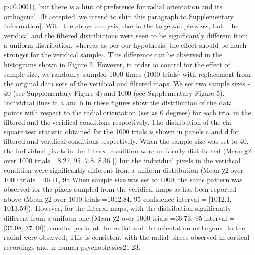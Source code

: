 	p<0.0001), but there is a hint of preference for radial orientation and its orthogonal.
	[If accepted, we intend to shift this paragraph to Supplementary Information]. With the above
	analysis, due to the large sample sizes, both the veridical and the filtered distributions were seen
	to be significantly different from a uniform distribution, whereas as per our hypothesis, the effect
	should be much stronger for the veridical samples. This difference can be observed in the
	histograms shown in Figure 2. However, in order to control for the effect of sample size, we
	randomly sampled 1000 times (1000 trials) with replacement from the original data sets of the
	veridical and filtered maps. We set two sample sizes - 40 (see Supplementary Figure 4) and
	1000 (see Supplementary Figure 5). Individual lines in a and b in these figures show the
	distribution of the data points with respect to the radial orientation (set as 0 degrees) for each
	trial in the filtered and the veridical conditions respectively. The distribution of the chi-square
	test statistic obtained for the 1000 trials is shown in panels c and d for filtered and veridical
	conditions respectively. When the sample size was set to 40, the individual pixels in the filtered
	condition were uniformly distributed (Mean χ2 over 1000 trials =8.27, 95%
	[7.8, 8.36 ]) but the individual pixels in the veridical condition were significantly different from a
	uniform distribution (Mean χ2 over 1000 trials =46.11, 95%
	When sample size was set to 1000, the same pattern was observed for the pixels sampled from
	the veridical maps as has been reported above (Mean χ2 over 1000 trials =1012.84, 95%
	confidence interval = [1012.1, 1013.59]). However, for the filtered maps, with the distribution
	significantly different from a uniform one (Mean χ2 over 1000 trials =36.73, 95%
	interval = [35.98, 37.48]), smaller peaks at the radial and the orientation orthogonal to the radial
	were observed, This is consistent with the radial biases observed in cortical recordings and in
	human psychophysics21-23.
	
